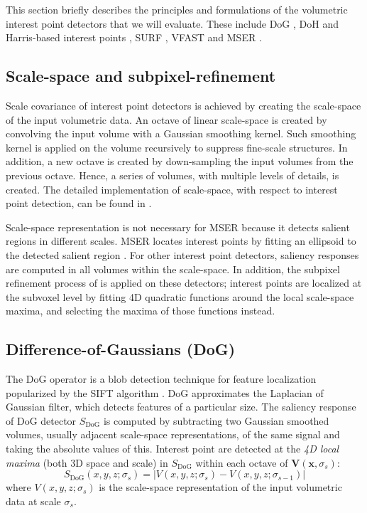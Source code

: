This section briefly describes the principles and formulations of the volumetric interest point detectors that we will evaluate.
These include DoG \cite{Flitton2010}, DoH and Harris-based interest points \cite{Laptev2005}, SURF \cite{Willems2008, Knopp2010}, VFAST \cite{Yu2010} and MSER \cite{Donoser2006, Riemenschneider2009}. 

\subsection{Scale-space and subpixel-refinement}
\label{sec/eval/subvoxel}

Scale covariance of interest point detectors is achieved by creating the scale-space of the input volumetric data. An octave of linear scale-space is created by convolving the input volume with a Gaussian smoothing kernel. Such smoothing kernel is applied on the volume recursively to suppress fine-scale structures. In addition, a new octave is created by down-sampling the input volumes from the previous octave. Hence, a series of volumes, with multiple levels of details, is created. The detailed implementation of scale-space, with respect to interest point detection, can be found in \cite{Lindeberg1998}. 

Scale-space representation is not necessary for MSER because it detects salient regions in different scales. MSER locates interest points by fitting an ellipsoid to the detected salient region \cite{Matas2004}. For other interest point detectors, saliency responses are computed in all volumes within the scale-space. In addition, the subpixel refinement process of \cite{Lowe2004} is applied on these detectors; interest points are localized at the subvoxel level by fitting 4D quadratic functions around the local scale-space maxima, and selecting the maxima of those functions instead. 

\subsection{Difference-of-Gaussians (DoG)}
The DoG operator is a blob detection technique for feature localization popularized by the SIFT algorithm \cite{Lowe2004}.    
DoG approximates the Laplacian of Gaussian filter, which detects features of a particular size. 
The saliency response of DoG detector $S_{\textrm{DoG}}$ is computed by subtracting two Gaussian smoothed volumes, usually adjacent scale-space representations, of the same signal and taking the absolute values of this.
Interest point are detected at the \emph{4D local maxima} (both 3D space and scale) in $S_{\textrm{DoG}}$ within each octave of $\mathbf{V}(\mathbf{x},\sigma_s)$:
\begin{equation}
S_{\textrm{DoG}}(x,y,z;\sigma_s) = |V(x,y,z;\sigma_s) - V(x,y,z;\sigma_{s-1})|
\end{equation}
where $V(x,y,z;\sigma_s)$ is the scale-space representation of the input volumetric data at scale $\sigma_s$.

